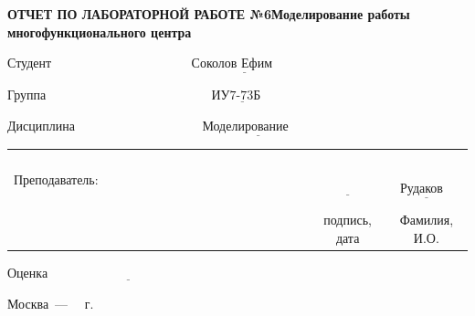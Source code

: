 \begin{titlepage}
	
	\begin{center}
		\noindent\begin{minipage}{1.2\textwidth}\centering
			\textbf{ОТЧЕТ ПО ЛАБОРАТОРНОЙ РАБОТЕ №6}\newline\textbf{Моделирование работы 
				многофункционального центра}\newline\newline
		\end{minipage}
	\end{center}

	\noindent Студент $\underline{\text{~~~~~~~~~~~~~~~~~~~~~~~~~~~~~~~~Соколов Ефим~~~~~~~~~~~~~~~~~~~~~~~~~~~~~~~~~~~~~~}}$
	
	\noindent Группа $\underline{\text{~~~~~~~~~~~~~~~~~~~~~~~~~~~~~~~~~~~~~~ИУ7-73Б~~~~~~~~~~~~~~~~~~~~~~~~~~~~~~~~~~~~~~~~~}}$
	
	\noindent Дисциплина $\underline{\text{~~~~~~~~~~~~~~~~~~~~~~~~~~~~~Моделирование~~~~~~~~~~~~~~~~~~~~~~~~~~~~~~~~~~~}}$\newline
	
	
	\noindent\begin{tabular}{lcc}
		&&\\
		&&\\
		&&\\
		&&\\
		Преподаватель: ~~~~~~~~~~~~~~~~~~~~~~~~~~~~~~~~~~~~~~~& $\underline{\text{~~~~~~~~~~~~}}$ & $\underline{\text{~~Рудаков И.В.~~}}$ \\
		& \footnotesize подпись, дата & \footnotesize Фамилия, И.О. \\
	\end{tabular}
	\newline\newline\newline
	\noindent Оценка $\underline{\text{~~~~~~~~~~~~~~~~~~~~~~~~~~~~~~~~~~~~}}$
	
	
	\begin{center}
		\vfill
		Москва~---~\the\year
		~г.
	\end{center}
 \restoregeometry
\end{titlepage}
